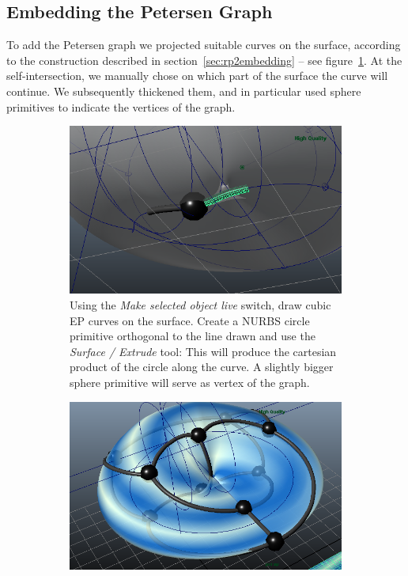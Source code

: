 \documentclass[11pt,            %
               a4paper,         %
               oneside,         %
               DIV12,           %
               fleqn,           %
               halfparskip,     %
               nochapterprefix, %
              ]{scrartcl} %
\theoremstyle{definition}
\begin{document}
\addtocounter{figure}{-1}

\subsection{Embedding the Petersen Graph}

To add the Petersen graph we projected suitable curves on the surface,
according to the construction described in
section~\ref{sec:rp2embedding} -- see figure~\ref{fig:construction05}.
At the self-intersection, we manually chose on which part of the surface
the curve will continue.
We subsequently thickened them, and in particular used sphere
primitives to indicate the vertices of the graph.

\begin{figure}[h]
  \caption{The final construction steps: Drawing the Petersen graph and
    applying a texture}
  \begin{subfigure}[t]{0.49\textwidth}
    \centering
    \includegraphics[width=\textwidth]{screenshots/construction05.png}
    \caption{\label{fig:construction05}%
      Using the \emph{Make selected object live} switch, draw cubic EP
      curves on the surface. Create a NURBS circle primitive orthogonal
      to the line drawn and use the \emph{Surface / Extrude} tool:
      This will produce the cartesian product of the circle along the
      curve. A slightly bigger sphere primitive will serve as vertex
      of the graph.}
  \end{subfigure}
  \hfill
  \begin{subfigure}[t]{0.49\textwidth}
    \centering
    \includegraphics[width=\textwidth]{screenshots/construction06.png}

\end{subfigure}
\end{figure}
\end{document}
